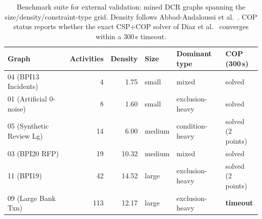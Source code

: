 \begin{table}[H]
\centering
\caption{Benchmark suite for external validation: mined \ac{DCR}
graphs spanning the size/density/constraint-type grid. Density follows
Abbad-Andaloussi et al.~\cite{Abbad-Andaloussi2023ComplexityLoad}. COP status
reports whether the exact CSP+COP solver of Diaz et
al.~\cite{Diaz2024Pareto-OptimalModels} converges within a 300\,s
timeout.}
\label{tab:external_grid}
{\renewcommand{\arraystretch}{1.5}
\setlength{\tabcolsep}{4pt}
\begin{tabular}{lrrlll}
\toprule
\textbf{Graph} & \textbf{Activities} & \textbf{Density} &
\textbf{Size} & \shortstack{\textbf{Dominant}\\\textbf{type}} & \shortstack{\textbf{COP}\\\textbf{(300\,s)}} \\
\midrule
04 (BPI13 Incidents)     & 4   & 1.75  & small  & mixed           & solved \\
01 (Artificial 0-noise)  & 8   & 1.60  & small  & exclusion-heavy & solved \\
05 (Synthetic Review Lg) & 14  & 6.00  & medium & condition-heavy & \shortstack{solved\\(2 points)} \\
03 (BPI20 RFP)           & 19  & 10.32 & medium & mixed           & solved \\
11 (BPI19)               & 42  & 14.52 & large  & exclusion-heavy & \shortstack{solved\\(2 points)} \\
09 (Large Bank Txn)      & 113 & 12.17 & large  & exclusion-heavy & \textbf{timeout} \\
\bottomrule
\end{tabular}}
\end{table}

